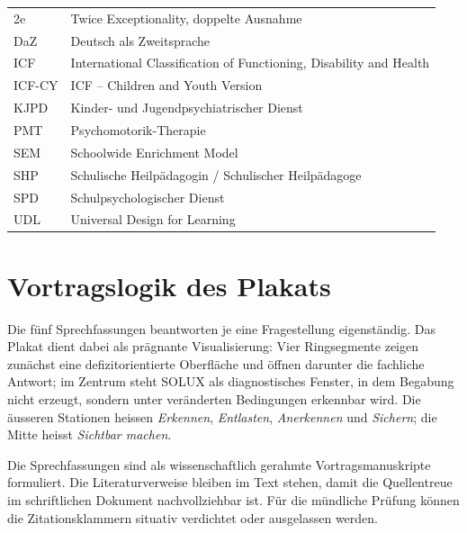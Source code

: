\documentclass[ngerman, a4paper]{article}
\begin{document}
\begin{tabular}{@{}ll@{}}
2e      & Twice Exceptionality, doppelte Ausnahme \\
DaZ     & Deutsch als Zweitsprache \\
ICF     & International Classification of Functioning, Disability and Health \\
ICF-CY  & ICF -- Children and Youth Version \\
KJPD    & Kinder- und Jugendpsychiatrischer Dienst \\
PMT     & Psychomotorik-Therapie \\
SEM     & Schoolwide Enrichment Model \\
SHP     & Schulische Heilpädagogin / Schulischer Heilpädagoge \\
SPD     & Schulpsychologischer Dienst \\
UDL     & Universal Design for Learning \\
\end{tabular}

\newpage
\tableofcontents

\newpage
{}
\renewcommand{\thepage}{\arabic{page}}

\section*{Vortragslogik des Plakats}

Die fünf Sprechfassungen beantworten je eine Fragestellung eigenständig. Das
Plakat dient dabei als prägnante Visualisierung: Vier Ringsegmente zeigen
zunächst eine defizitorientierte Oberfläche und öffnen darunter die fachliche
Antwort; im Zentrum steht SOLUX als diagnostisches Fenster, in dem Begabung
nicht erzeugt, sondern unter veränderten Bedingungen erkennbar wird. Die
äusseren Stationen heissen \textit{Erkennen}, \textit{Entlasten},
\textit{Anerkennen} und \textit{Sichern}; die Mitte heisst \textit{Sichtbar
machen}.

Die Sprechfassungen sind als wissenschaftlich gerahmte Vortragsmanuskripte
formuliert. Die Literaturverweise bleiben im Text stehen, damit die Quellentreue
im schriftlichen Dokument nachvollziehbar ist. Für die mündliche Prüfung können
die Zitationsklammern situativ verdichtet oder ausgelassen werden.

\newpage
\end{document}
